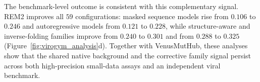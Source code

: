\documentclass{article} %
\begin{document}
The benchmark-level outcome is consistent with this complementary signal. \textsc{REM2} improves all $59$ configurations: masked sequence models rise from $0.106$ to $0.246$ and autoregressive models from $0.121$ to $0.228$, while structure-aware and inverse-folding families improve from $0.240$ to $0.301$ and from $0.288$ to $0.325$ (Figure~\ref{fig:virogym_analysis}d). Together with VenusMutHub, these analyses show that the shared native background and the corrective family signal persist across both high-precision small-data assays and an independent viral benchmark.
\end{document}
